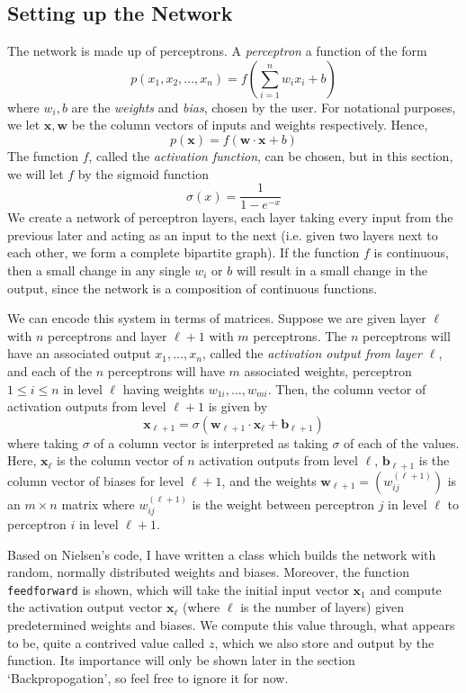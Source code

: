 \documentclass[10pt]{article}
\begin{document}
\subsection{Setting up the Network}
The network is made up of perceptrons. A \textit{perceptron} a function of the form
\[
p(x_1,x_2,...,x_n) = f\left(\sum_{i=1}^{n}w_ix_i+b\right)
\]
where $w_i,b$ are the \textit{weights} and \textit{bias}, chosen by the user. For notational purposes, we let $\mathbf{x}, \mathbf{w}$ be the column vectors of inputs and weights respectively. Hence,
\[
p(\mathbf{x}) = f\left(\mathbf{w} \cdot \mathbf{x}+ b\right)
\]
The function $f$, called the \textit{activation function}, can be chosen, but in this section, we will let $f$ by the sigmoid function
\[
\sigma(x)= \frac{1}{1-e^{-x}}
\]
We create a network of perceptron layers, each layer taking every input from the previous later and acting as an input to the next (i.e. given two layers next to each other, we form a complete bipartite graph). If the function $f$ is continuous, then a small change in any single $w_i$ or $b$ will result in a small change in the output, since the network is a composition of continuous functions.\par We can encode this system in terms of matrices. Suppose we are given layer $\ell$ with $n$ perceptrons and layer $\ell+1$ with $m$ perceptrons. The $n$ perceptrons will have an associated output $x_1,...,x_n$, called the \textit{activation output from layer $\ell$}, and each of the $n$ perceptrons will have $m$ associated weights, perceptron $1\leq i \leq n$ in level $\ell$ having weights $w_{1i}, ... , w_{mi}$. Then, the column vector of  activation outputs from level $\ell+1$ is given by
\[
 \mathbf{x}_{\ell+1} = \sigma\left(\mathbf{w}_{\ell+1} \cdot \mathbf{x_\ell} + \mathbf{b}_{\ell+1} \right)
\]
where taking $\sigma$ of a column vector is interpreted as taking $\sigma$ of each of the values. Here, $\mathbf{x_\ell}$ is the column vector of $n$ activation outputs from level $\ell$, $\mathbf{b}_{\ell+1}$ is the column vector of biases for level $\ell+1$, and the weights $\mathbf{w}_{\ell+1}=\left(w_{ij}^{(\ell+1)}\right)$ is an $m \times n$ matrix where $w_{ij}^{(\ell+1)}$ is the weight between perceptron $j$ in level $\ell$ to perceptron $i$ in level $\ell+1$.\par
Based on Nielsen's code, I have written a class which builds the network with random, normally distributed weights and biases. Moreover, the function \lstinline{feedforward} is shown, which will take the initial input vector $\mathbf{x}_1$ and compute the activation output vector $\mathbf{x}_\ell$ (where $\ell$ is the number of layers) given predetermined weights and biases. We compute this value through, what appears to be, quite a contrived value called $z$, which we also store and output by the function. Its importance will only be shown later in the section `Backpropogation', so feel free to ignore it for now.
\end{document}

